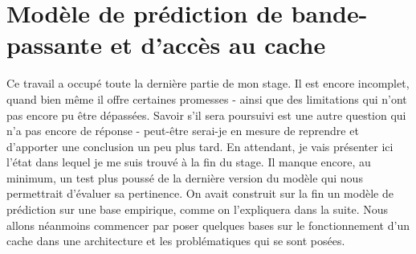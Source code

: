 \documentclass{report}
\begin{document}
\chapter{Modèle de prédiction de bande-passante et d'accès au cache}
Ce travail a occupé toute la dernière partie de mon stage. Il est encore incomplet, quand bien
même il offre certaines promesses - ainsi que des limitations qui n'ont pas encore pu être dépassées.
Savoir s'il sera poursuivi est une autre question qui n'a pas encore de réponse - peut-être serai-je
en mesure de reprendre et d'apporter une conclusion un peu plus tard. En attendant, je vais
présenter ici l'état dans lequel je me suis trouvé à la fin du stage. Il manque encore, au minimum,
un test plus poussé de la dernière version du modèle qui nous permettrait d'évaluer sa pertinence.
On avait construit sur la fin un modèle de prédiction sur une base empirique, comme on l'expliquera
dans la suite. Nous allons néanmoins commencer par poser quelques bases sur le fonctionnement d'un
cache dans une architecture et les problématiques qui se sont posées.
\end{document}
